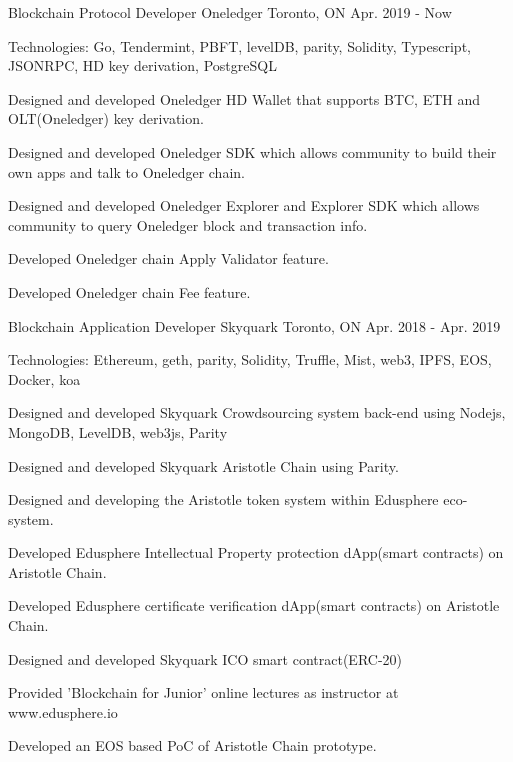 \vspace{-2.0em}
\begin{cventries}
    \cventry
    {Blockchain Protocol Developer}
    {Oneledger}
    {Toronto, ON}
    {Apr. 2019 - Now}
    {
      \begin{cvitems}
        \item {Technologies: Go, Tendermint, PBFT, levelDB, parity, Solidity, Typescript, JSONRPC, HD key derivation, PostgreSQL}
        \item {Designed and developed Oneledger HD Wallet that supports BTC, ETH and OLT(Oneledger) key derivation.}
        \item {Designed and developed Oneledger SDK which allows community to build their own apps and talk to Oneledger chain.}
        \item {Designed and developed Oneledger Explorer and Explorer SDK which allows community to query Oneledger block and transaction info.}
        \item {Developed Oneledger chain Apply Validator feature.}
        \item {Developed Oneledger chain Fee feature.}
      \end{cvitems}
    }

  \cventry
    {Blockchain Application Developer}
    {Skyquark}
    {Toronto, ON}
    {Apr. 2018 - Apr. 2019}
    {
      \begin{cvitems}
        \item {Technologies: Ethereum, geth, parity, Solidity, Truffle, Mist, web3, IPFS, EOS, Docker, koa}
        \item {Designed and developed Skyquark Crowdsourcing system back-end using Nodejs, MongoDB, LevelDB, web3js, Parity}
        \item {Designed and developed Skyquark Aristotle Chain using Parity.}
        \item {Designed and developing the Aristotle token system within Edusphere eco-system.}
        \item {Developed Edusphere Intellectual Property protection dApp(smart contracts) on Aristotle Chain.}
        \item {Developed Edusphere certificate verification dApp(smart contracts) on Aristotle Chain.}
        \item {Designed and developed Skyquark ICO smart contract(ERC-20)}
        \item {Provided 'Blockchain for Junior' online lectures as instructor at www.edusphere.io}
        \item {Developed an EOS based PoC of Aristotle Chain prototype.}
      \end{cvitems}
    }
	


\end{cventries}
